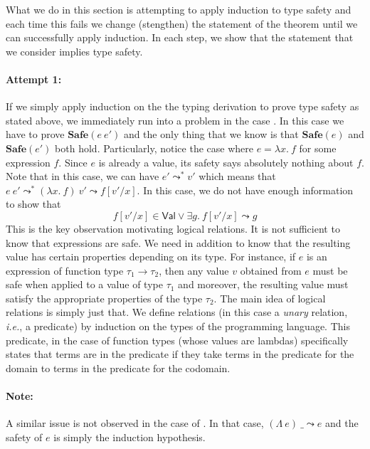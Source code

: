 \documentclass{article}
\newcommand{\ie}{\textit{i.e.}}
\newcommand{\VAL}{\mathsf{Val}}
\newcommand{\TArg}{\_}
\newcommand{\TLam}{\Lambda}
\newcommand{\expr}{e}
\newcommand{\exprB}{f}
\newcommand{\exprC}{g}
\newcommand{\val}{v}
\newcommand{\var}{x}
\newcommand{\typ}{\tau}
\newcommand{\step}{\leadsto}
\newcommand{\steps}{\leadsto^*}
\begin{document}
What we do in this section is attempting to apply induction to type safety and each time this fails we change (stengthen) the statement of the theorem until we can successfully apply induction. In each step, we show that the statement that we consider implies type safety.

\paragraph{Attempt 1:}
If we simply apply induction on the the typing derivation to prove
type safety as stated above, we immediately run into a problem
in the case . In this case we have to prove $\mathbf{Safe}(\expr~\expr')$ and the only thing that we know is that $\mathbf{Safe}(\expr)$ and $\mathbf{Safe}(\expr')$ both hold.
Particularly, notice the case where $\expr = \lambda \var.~\exprB$ for some expression $\exprB$.
Since $\expr$ is already a value, its safety says absolutely nothing about $\exprB$.
Note that in this case, we can have $\expr' \steps \val'$ which means that $\expr~\expr' \steps (\lambda \var.~\exprB)~\val' \step \exprB[\val'/\var]$.
In this case, we do not have enough information to show that
\[
\exprB[\val'/\var] \in \VAL \lor \exists \exprC.~\exprB[\val'/\var] \step \exprC
\]
This is the key observation motivating logical relations.
It is not sufficient to know that expressions are safe.
We need in addition to know that the resulting value has certain properties depending on its type.
For instance, if $\expr$ is an expression of function type $\typ_1 \to \typ_2$, then any value $\val$ obtained from $\expr$ must be safe when applied to a value of type $\typ_1$ and moreover, the resulting value must satisfy the appropriate properties of the type $\typ_2$.
The main idea of logical relations is simply just that.
We define relations (in this case a \emph{unary} relation, \ie{}, a predicate) by induction on the types of the programming language.
This predicate, in the case of function types (whose values are lambdas) specifically states that terms are in the predicate if they
take terms in the predicate for the domain to terms in the predicate for the codomain.

\paragraph{Note:} A similar issue is not observed in the case of .
In that case, $(\TLam~\expr)~\TArg \step \expr$ and the safety of $\expr$ is simply the induction hypothesis.
\end{document}
